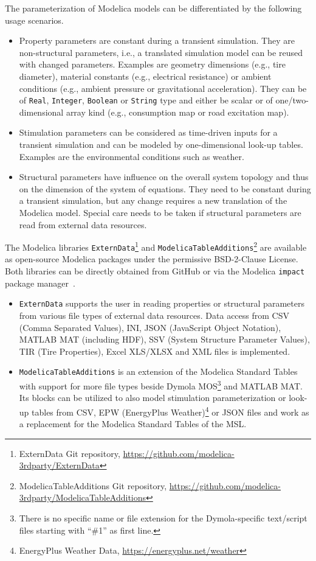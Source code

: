 \documentclass{modelica}
\newcommand{\modelica}[1]{\lstinline[language=modelica]|#1|}
\begin{document}
The parameterization of Modelica models can be differentiated by the following usage scenarios.
\begin{itemize}
 \item Property parameters are constant during a transient simulation. They are non-structural parameters, i.e., a translated simulation model can be reused with changed parameters. Examples are geometry dimensions (e.g., tire diameter), material constants (e.g., electrical resistance) or ambient conditions (e.g., ambient pressure or gravitational acceleration). They can be of \modelica{Real}, \modelica{Integer}, \modelica{Boolean} or \modelica{String} type and either be scalar or of one/two-dimensional array kind (e.g., consumption map or road excitation map).
 \item Stimulation parameters can be considered as time-driven inputs for a transient simulation and can be modeled by one-dimensional look-up tables. Examples are the environmental conditions such as weather.
 \item Structural parameters have influence on the overall system topology and thus on the dimension of the system of equations. They need to be constant during a transient simulation, but any change requires a new translation of the Modelica model. Special care needs to be taken if structural parameters are read from external data resources.
\end{itemize}

The Modelica libraries \modelica{ExternData}\footnote{ExternData Git repository, \url{https://github.com/modelica-3rdparty/ExternData}} and \modelica{ModelicaTableAdditions}\footnote{ModelicaTableAdditions Git repository, \url{https://github.com/modelica-3rdparty/ModelicaTableAdditions}} are available as open-source Modelica packages under the permissive BSD-2-Clause License.
Both libraries can be directly obtained from GitHub or via the Modelica \modelica{impact} package manager~\cite{impact, Tiller2015WhereIG}.
\begin{itemize}
 \item \modelica{ExternData} supports the user in reading properties or structural parameters from various file types of external data resources.
 Data access from CSV (Comma Separated Values), INI, JSON (JavaScript Object Notation), MATLAB MAT (including HDF), SSV (System Structure Parameter Values), TIR (Tire Properties), Excel XLS/XLSX and XML files is implemented.
 \item \modelica{ModelicaTableAdditions} is an extension of the Modelica Standard Tables~\cite{modelica2014tables} with support for more file types beside Dymola MOS\footnote{There is no specific name or file extension for the Dymola-specific text/script files starting with ``\#1'' as first line.} and MATLAB MAT.
 Its blocks can be utilized to also model stimulation parameterization or look-up tables from CSV, EPW (EnergyPlus Weather)\footnote{EnergyPlus Weather Data, \url{https://energyplus.net/weather}} or JSON files and work as a replacement for the Modelica Standard Tables of the MSL.
\end{itemize}
\end{document}
